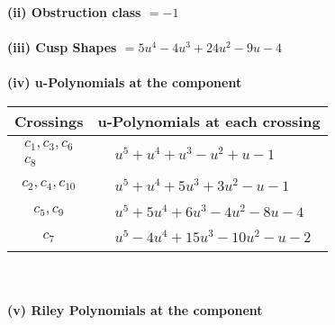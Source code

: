 \documentclass[1p]{elsarticle_modified}
\theoremstyle{definition}
\begin{document}
\flushleft \textbf{(ii) Obstruction class $= -1$}\\~\\
\flushleft \textbf{(iii) Cusp Shapes $= 5 u^4-4 u^3+24 u^2-9 u-4$}\\~\\
\newpage\renewcommand{\arraystretch}{1}
\flushleft \textbf{(iv) u-Polynomials at the component}\newline \\
\begin{tabular}{m{50pt}|m{274pt}}
Crossings & \hspace{64pt}u-Polynomials at each crossing \\
\hline $$\begin{aligned}c_{1},c_{3},c_{6}\\c_{8}\end{aligned}$$&$\begin{aligned}
&u^5+u^4+u^3- u^2+u-1
\end{aligned}$\\
\hline $$\begin{aligned}c_{2},c_{4},c_{10}\end{aligned}$$&$\begin{aligned}
&u^5+u^4+5 u^3+3 u^2- u-1
\end{aligned}$\\
\hline $$\begin{aligned}c_{5},c_{9}\end{aligned}$$&$\begin{aligned}
&u^5+5 u^4+6 u^3-4 u^2-8 u-4
\end{aligned}$\\
\hline $$\begin{aligned}c_{7}\end{aligned}$$&$\begin{aligned}
&u^5-4 u^4+15 u^3-10 u^2- u-2
\end{aligned}$\\
\hline
\end{tabular}\\~\\
\newpage\renewcommand{\arraystretch}{1}
\flushleft \textbf{(v) Riley Polynomials at the component}\newline \\
\end{document}
